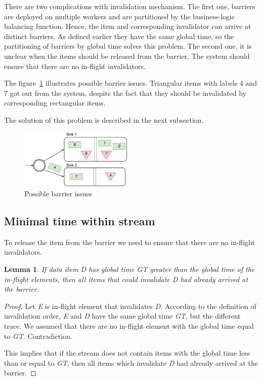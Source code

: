 There are two complications with invalidation mechanism. The first one, barriers are deployed on multiple workers and are partitioned by the business-logic balancing function. Hence, the item and corresponding invalidator can arrive at distinct barriers. As defined earlier they have the same global time, so the partitioning of barriers by global time solves this problem. The second one, it is unclear when the items should be released from the barrier. The system should ensure that there are no in-flight invalidators. 

The figure~\ref{invalidation-problems-figure} illustrates possible barrier issues. Triangular items with labels 4 and 7 got out from the system, despite the fact that they should be invalidated by corresponding rectangular items. 

The solution of this problem is described in the next subsection. 

\begin{figure}[htbp]
  \centering
  \includegraphics[width=0.48\textwidth]{pics/invalidation_problems}
  \caption{Possible barrier issues}
  \label {invalidation-problems-figure}
\end{figure}

\subsection{Minimal time within stream}

To release the item from the barrier we need to ensure that there are no in-flight invalidators. 

\newtheorem{minimal-time-claim}{Lemma}

\begin{minimal-time-claim}
  If data item {\it D} has global time {\it GT} greater than the global time of the in-flight elements, then all items that could invalidate {\it D} had already arrived at the barrier.
\end{minimal-time-claim}

\begin{proof}
  Let {\it E} is in-flight element that invalidates {\it D}. According to the definition of invalidation order, {\it E} and {\it D} have the same global time {\it GT}, but the different trace. We assumed that there are no in-flight element with the global time equal to {\it GT}. Contradiction.

  This implies that if the stream does not contain items with the global time less than or equal to {\it GT}, then all items which invalidate {\it D} had already arrived at the barrier. 
\end{proof}

